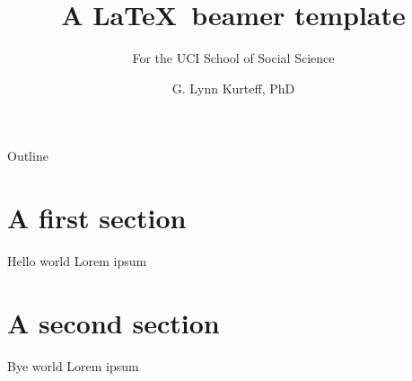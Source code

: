 \documentclass[aspectratio=169]{beamer} %
\title[Beamer template]{A \LaTeX~beamer template}
\subtitle{For the UCI School of Social Science}
\author{G. Lynn Kurteff, PhD}
\institute{UCI Department of Cognitive Sciences}
\begin{document}
    \begin{frame}
        \titlepage
    \end{frame}

    \begin{frame}{Outline}
        \tableofcontents
    \end{frame}

    \section{A first section}

    \begin{frame}{Hello world}
        Lorem ipsum    
    \end{frame}

    \section{A second section}

    \begin{frame}{Bye world}
        Lorem ipsum    
    \end{frame}
\end{document}
